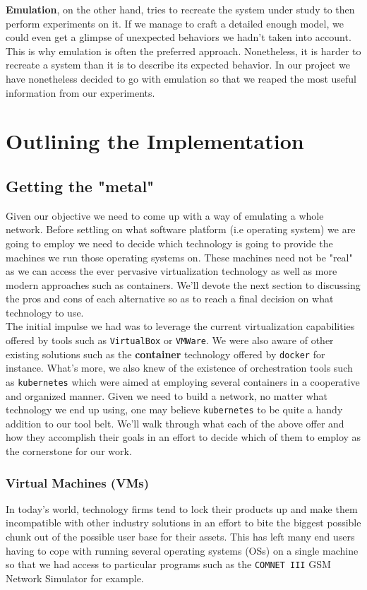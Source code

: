             \textbf{Emulation}, on the other hand, tries to recreate the system under study to then perform experiments on it. If we manage to craft a detailed enough model, we could even get a glimpse of unexpected behaviors we hadn't taken into account. This is why emulation is often the preferred approach. Nonetheless, it is harder to recreate a system than it is to describe its expected behavior. In our project we have nonetheless decided to go with emulation so that we reaped the most useful information from our experiments.\\

    \section{Outlining the Implementation}
        \subsection{Getting the "metal"}
            Given our objective we need to come up with a way of emulating a whole network. Before settling on what software platform (i.e operating system) we are going to employ we need to decide which technology is going to provide the machines we run those operating systems on. These machines need not be "real" as we can access the ever pervasive virtualization technology as well as more modern approaches such as containers. We'll devote the next section to discussing the pros and cons of each alternative so as to reach a final decision on what technology to use.\\

            The initial impulse we had was to leverage the current virtualization capabilities offered by tools such as \texttt{VirtualBox} or \texttt{VMWare}. We were also aware of other existing solutions such as the \textbf{container} technology offered by \texttt{docker} for instance. What's more, we also knew of the existence of orchestration tools such as \texttt{kubernetes} which were aimed at employing several containers in a cooperative and organized manner. Given we need to build a network, no matter what technology we end up using, one may believe \texttt{kubernetes} to be quite a handy addition to our tool belt. We'll walk through what each of the above offer and how they accomplish their goals in an effort to decide which of them to employ as the cornerstone for our work.

            \subsubsection{Virtual Machines (VMs)}
                In today's world, technology firms tend to lock their products up and make them incompatible with other industry solutions in an effort to bite the biggest possible chunk out of the possible user base for their assets. This has left many end users having to cope with running several operating systems (OSs) on a single machine so that we had access to particular programs such as the \texttt{COMNET III} GSM Network Simulator for example.\\

